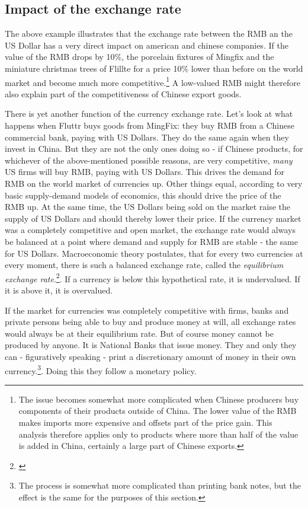 \subsection{Impact of the exchange rate}

The above example illustrates that the exchange rate between the RMB an the US Dollar has 
a very direct impact on american and chinese companies. If the value of the RMB drops by 10\%, the porcelain fixtures of Mingfix and the miniature christmas trees of Flillte for a price 10\% lower than before on the world market and become much more competitive.\footnote{The issue becomes somewhat more complicated when Chinese producers buy components of their products outside of China. The lower value of the RMB makes imports more expensive and offsets part of the price gain. This analysis therefore applies only to products where more than half of the value is added in China, certainly a large part of Chinese exports.} A low-valued RMB might therefore also explain part of the competitiveness of Chinese export goods. 

There is yet another function of the currency exchange rate. Let's look at what happens when Fluttr buys goods from MingFix: they buy RMB from a Chinese commercial bank, paying with US Dollars. They do the same again when they invest in China. But they are not the only ones doing so - if Chinese products, for whichever of the above-mentioned possible reasons, are very competitive, \emph{many} US firms will buy RMB, paying with US Dollars. This drives the demand for RMB on the world market of currencies up. Other things equal, according to very basic supply-demand models of economics, this should drive the price of the RMB up. At the same time, the US Dollars being sold on the market raise the supply of US Dollars and should thereby lower their price. If the currency market was a completely competitive and open market, the exchange rate would always be balanced at a point where demand and supply for RMB are stable - the same for US Dollars. Macroeconomic theory postulates, that for every two currencies at every 
moment, there is such a balanced exchange rate, called the \emph{equilibrium exchange rate}.\footnote{\cite[p. ?]{Krugman}}. If a currency is below this hypothetical rate, it is undervalued. If it is above it, it is overvalued.

If the market for currencies was completely competitive with firms, banks and private persons being able to buy and produce money at will, all exchange rates would always be at their equilibrium rate. But of course money cannot be produced by anyone. It is National Banks that issue money. They and only they can - figuratively speaking - print a discretionary amount of money in their own 
currency.\footnote{The process is somewhat more complicated than 
printing bank notes, but the effect is the same for the purposes of this 
section.}. Doing this they follow a monetary policy. 


